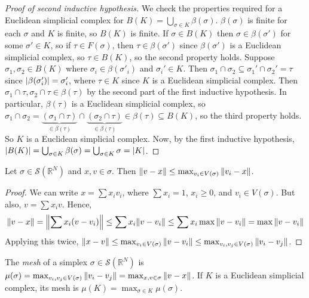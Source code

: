 \begin{proof}[Proof of second inductive hypothesis]
	We check the properties required for a Euclidean simplicial complex for \( B(K) = \bigcup_{\sigma \in K} \beta(\sigma) \).
	\( \beta(\sigma) \) is finite for each \( \sigma \) and \( K \) is finite, so \( B(K) \) is finite.
	If \( \sigma \in B(K) \) then \( \sigma \in \beta(\sigma') \) for some \( \sigma' \in K \), so if \( \tau \in F(\sigma) \), then \( \tau \in \beta(\sigma') \) since \( \beta(\sigma') \) is a Euclidean simplicial complex, so \( \tau \in B(K) \), so the second property holds.
	Suppose \( \sigma_1, \sigma_2 \in B(K) \) where \( \sigma_i \in \beta(\sigma'_i) \) and \( \sigma_i' \in K \).
	Then \( \sigma_1 \cap \sigma_2 \subseteq \sigma_1' \cap \sigma_2' = \tau \) since \( \abs{\beta(\sigma'_i)} = \sigma'_i \), where \( \tau \in K \) since \( K \) is a Euclidean simplicial complex.
	Then \( \sigma_1 \cap \tau, \sigma_2 \cap \tau \in \beta(\tau) \) by the second part of the first inductive hypothesis.
	In particular, \( \beta(\tau) \) is a Euclidean simplicial complex, so \( \sigma_1 \cap \sigma_2 = \underbrace{(\sigma_1 \cap \tau)}_{\in \beta(\tau)} \cap \underbrace{(\sigma_2 \cap \tau)}_{\in \beta(\tau)} \in \beta(\tau) \subseteq B(K) \), so the third property holds.
	So \( K \) is a Euclidean simplicial complex.
	Now, by the first inductive hypothesis, \( \abs{B(K)} = \bigcup_{\sigma \in K} \beta(\sigma) = \bigcup_{\sigma \in K} \sigma = \abs{K} \).
\end{proof}
\begin{lemma}
	Let \( \sigma \in \mathcal S(\mathbb R^N) \) and \( x, v \in \sigma \).
	Then \( \norm{v - x} \leq \max_{v_i \in V(\sigma)} \norm{v_i - x} \).
\end{lemma}
\begin{proof}
	We can write \( x = \sum x_i v_i \), where \( \sum x_i = 1 \), \( x_i \geq 0 \), and \( v_i \in V(\sigma) \).
	But also, \( v = \sum x_i v \).
	Hence,
	\[ \norm{v - x} = \norm{\sum x_i (v - v_i)} \leq \sum x_i \norm{v - v_i} \leq \sum x_i \max\norm{v - v_i} = \max \norm{v - v_i} \]
	Applying this twice, \( \norm{x - v} \leq \max_{v_i \in V(\sigma)} \norm{v - v_i} \leq \max_{v_i, v_j \in V(\sigma)} \norm{v_i - v_j} \).
\end{proof}
\begin{definition}
	The \emph{mesh} of a simplex \( \sigma \in \mathcal S(\mathbb R^N) \) is \( \mu(\sigma) = \max_{v_i, v_j \in V(\sigma)} \norm{v_i - v_j} = \max_{x, v \in \sigma} \norm{v - x} \).
	If \( K \) is a Euclidean simplicial complex, its mesh is \( \mu(K) = \max_{\sigma \in K} \mu(\sigma) \).
\end{definition}
